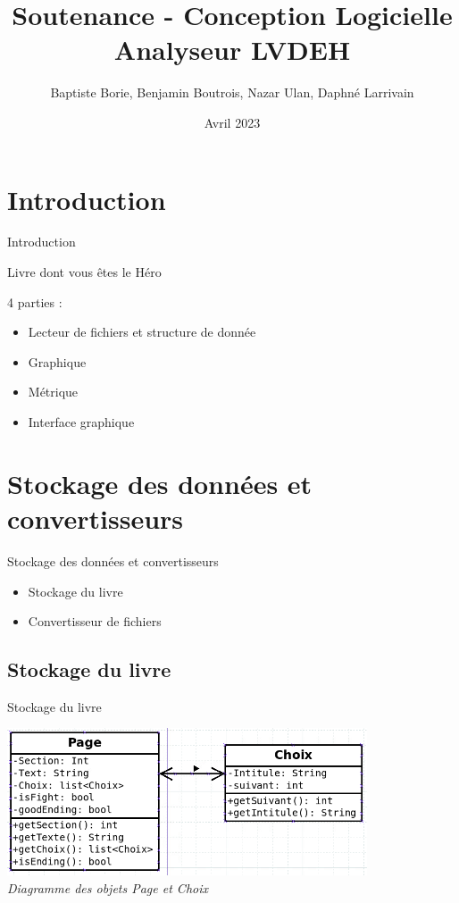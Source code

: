 \documentclass[aspectratio=169,xcolor=dvipsnames]{beamer}
\title{Soutenance - Conception Logicielle Analyseur LVDEH}
\author{Baptiste Borie, Benjamin Boutrois, Nazar Ulan, Daphné Larrivain}
\date{Avril 2023}
\begin{document}
\maketitle
\begin{frame}
\tableofcontents
\end{frame}

\section{Introduction}
\begin{frame}{Introduction}
\begin{center}
    \huge Livre dont vous êtes le Héro
\end{center}
 
 4 parties :
 \begin{center}
    \begin{itemize}
        \item Lecteur de fichiers et structure de donnée
        \item Graphique 
        \item Métrique
        \item Interface graphique
    \end{itemize}
    \end{center}
\end{frame}
\section{Stockage des données et convertisseurs}
\begin{frame}{Stockage des données et convertisseurs}
    \begin{center}
    \begin{itemize}
        \item Stockage du livre
        \item Convertisseur de fichiers
    \end{itemize}
    \end{center}
\end{frame}
\subsection{Stockage du livre}
\begin{frame}{Stockage du livre}
    \begin{center}
         \includegraphics[width=0.8\textwidth]{diagramme_page.png}{\small\textsl{\\Diagramme des objets Page et Choix}}
    \end{center}
\end{frame}
\end{document}
